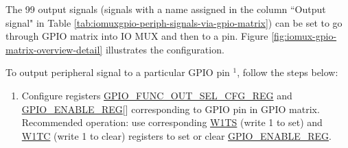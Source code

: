 \documentclass[main\_\_EN.tex]{subfiles}
\begin{document}
The 99 output signals (signals with a name assigned in the column ``Output signal" in Table  \ref{tab:iomuxgpio-periph-signals-via-gpio-matrix}) can be set to go through GPIO matrix into IO MUX and then to a pin. Figure  \ref{fig:iomux-gpio-matrix-overview-detail} illustrates the configuration.

To output peripheral signal  to a particular GPIO pin \hyperref[output-note-1]{$^1$}, follow the steps below:

\begin{enumerate}
    \item Configure registers \hyperref[regdesc:GPIOFUNCNOUTSELCFGREG]{GPIO\_FUNC\_OUT\_SEL\_CFG\_REG} and  \hyperref[regdesc:GPIOENABLEREG]{GPIO\_ENABLE\_REG}[] corresponding to GPIO pin  in GPIO matrix. Recommended operation: use corresponding \hyperref[regdesc:GPIOENABLEW1TSREG]{W1TS} (write 1 to set) and \hyperref[regdesc:GPIOENABLEW1TCREG]{W1TC} (write 1 to clear) registers to set or clear \hyperref[regdesc:GPIOENABLEREG]{GPIO\_ENABLE\_REG}.



\end{enumerate}
\end{document}
